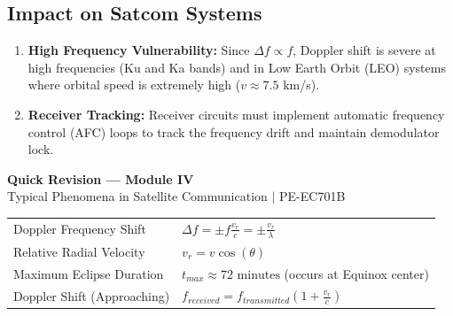 \documentclass[12pt,a4paper]{article}
\renewcommand{\arraystretch}{1.45}
\begin{document}
\subsection{Impact on Satcom Systems}
\begin{enumerate}[label=\textbf{\arabic*.}, leftmargin=*, itemsep=3pt]
  \item \textbf{High Frequency Vulnerability:} Since $\Delta f \propto f$, Doppler shift is severe at high frequencies (Ku and Ka bands) and in Low Earth Orbit (LEO) systems where orbital speed is extremely high ($v \approx 7.5$ km/s).
  \item \textbf{Receiver Tracking:} Receiver circuits must implement automatic frequency control (AFC) loops to track the frequency drift and maintain demodulator lock.
\end{enumerate}

\newpage
\begin{center}
  {\large\bfseries\color{myred} Quick Revision --- Module IV}\\[3pt]
  {\small\color{mydark} Typical Phenomena in Satellite Communication $|$ PE-EC701B}
\end{center}
\noindent{\color{myred}\rule{\linewidth}{1.2pt}}
\vspace{4pt}

\begin{tcolorbox}[formulabox, title={\textbf{Key Formulas at a Glance}}]
\renewcommand{\arraystretch}{1.9}
\begin{tabularx}{\linewidth}{B{5.0cm} X}Doppler Frequency Shift & $\displaystyle \Delta f = \pm f \frac{v_r}{c} = \pm \frac{v_r}{\lambda}$ \\[4pt]
Relative Radial Velocity & $v_r = v \cos(\theta)$ \\[4pt]
Maximum Eclipse Duration & $t_{max} \approx 72 \text{ minutes}$ (occurs at Equinox center) \\[4pt]
Doppler Shift (Approaching) & $\displaystyle f_{received} = f_{transmitted} \left( 1 + \frac{v_r}{c} \right)$
\end{tabularx}
\end{tcolorbox}
\end{document}
